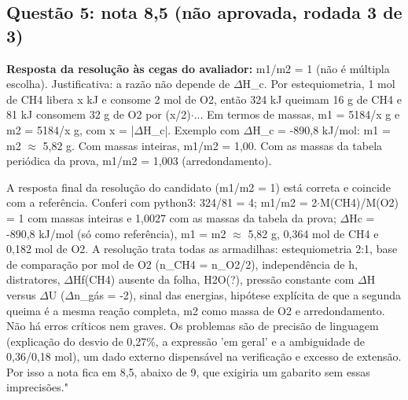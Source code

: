 \documentclass{article}%
\begin{document}
\subsection*{Questão 5: nota 8,5 (não aprovada, rodada 3 de 3)}%
\textbf{Resposta da resolução às cegas do avaliador:} m1/m2 = 1 (não é múltipla escolha).\newline%
\newline%
Justificativa: a razão não depende de $\Delta$H\_c. Por estequiometria, 1 mol de CH4 libera x kJ e consome 2 mol de O2, então 324 kJ queimam 16 g de CH4 e 81 kJ consomem 32 g de O2 por (x/2)$\cdot$... Em termos de massas, m1 = 5184/x g e m2 = 5184/x g, com x = |$\Delta$H\_c|. Exemplo com $\Delta$H\_c = -890,8 kJ/mol: m1 = m2 $\approx$ 5,82 g.\newline%
\newline%
Com massas inteiras, m1/m2 = 1,00. Com as massas da tabela periódica da prova, m1/m2 = 1,003 (arredondamento).\par %
A resposta final da resolução do candidato (m1/m2 = 1) está correta e coincide com a referência. Conferi com python3: 324/81 = 4; m1/m2 = 2$\cdot$M(CH4)/M(O2) = 1 com massas inteiras e 1,0027 com as massas da tabela da prova; $\Delta$Hc = -890,8 kJ/mol (só como referência), m1 = m2 $\approx$ 5,82 g, 0,364 mol de CH4 e 0,182 mol de O2. A resolução trata todas as armadilhas: estequiometria 2:1, base de comparação por mol de O2 (n\_CH4 = n\_O2/2), independência de h, distratores, $\Delta$Hf(CH4) ausente da folha, H2O(?), pressão constante com $\Delta$H versus $\Delta$U ($\Delta$n\_gás = -2), sinal das energias, hipótese explícita de que a segunda queima é a mesma reação completa, m2 como massa de O2 e arredondamento. Não há erros críticos nem graves. Os problemas são de precisão de linguagem (explicação do desvio de 0,27\%, a expressão 'em geral' e a ambiguidade de 0,36/0,18 mol), um dado externo dispensável na verificação e excesso de extensão. Por isso a nota fica em 8,5, abaixo de 9, que exigiria um gabarito sem essas imprecisões."%
\end{document}
